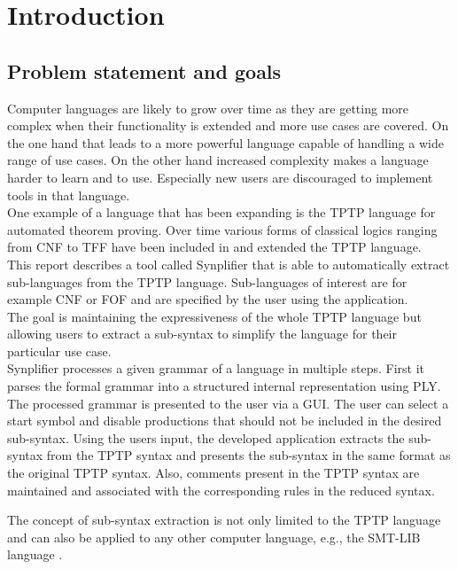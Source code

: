 
\chapter{Introduction}\label{cha:Introduction}

\section{Problem statement and goals}\label{sec:Aufgabenstellung}

Computer languages are likely to grow over time as they are getting more complex when their functionality is extended and more use cases are covered.
On the one hand that leads to a more powerful language capable of handling a wide range of use cases.
On the other hand increased complexity makes a language harder to learn and to use. Especially new users are discouraged to implement tools in that language.\\
One example of a language that has been expanding is the \ac{TPTP} language for automated theorem proving. Over time
various forms of classical logics ranging from \ac{CNF} to \ac{TFF} have been included in and extended the \ac{TPTP} language. \\
This report describes a tool called \ac{Synplifier} that is able to automatically extract sub-languages from the \ac{TPTP} language. Sub-languages of interest are for example \ac{CNF} or \ac{FOF} and are specified by the user using the application.\\
The goal is maintaining the expressiveness of the whole \ac{TPTP} language but allowing users to extract a sub-syntax to simplify the language for their particular use case. \\
\ac{Synplifier} processes a given grammar of a language in multiple steps.
First it parses the formal grammar into a structured internal representation using \ac{PLY}.
The processed grammar is presented to the user via a GUI. The user can select a start symbol and disable productions that should not be included in the desired sub-syntax.
Using the users input, the developed application extracts the sub-syntax from the \ac{TPTP} syntax and presents the sub-syntax in the same format as the original \ac{TPTP} syntax.
Also, comments present in the \ac{TPTP} syntax are maintained and associated with the corresponding rules in the reduced syntax.

The concept of sub-syntax extraction is not only limited to the \ac{TPTP} language and can also
be applied to any other computer language, e.g., the SMT-LIB language \cite{BFT-SMTLIB-17}.

